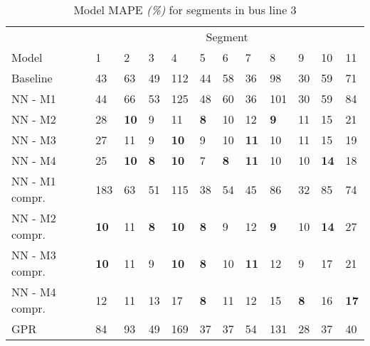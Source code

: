\begin{table}[H]
  \centering
  \caption{Model MAPE \textit{(\%)} for segments in bus line 3}
  \label{fig:model-mape-of-segs-203}
  \begin{adjustbox}{center}

    \begin{tabular}{l|l|l|l|l|l|l|l|l|l|l|l}
      & \multicolumn{11}{c}{Segment}                                                                                                                                                      \\
		Model          & 1             & 2             & 3             & 4             & 5             & 6            & 7              & 8             & 9             & 10             & 11               \\ 
		\hline
		Baseline       & 43          & 63          & 49          & 112         & 44          & 58         & 36           & 98          & 30          & 59           & 71             \\
		NN - M1        & 44         & 66         & 53         & 125        & 48         & 60        & 36          & 101        & 30         & 59          & 84            \\
		NN - M2        & 28         & \textbf{10}         & 9          & 11         & \textbf{8}          & 10        & 12          & \textbf{9} & 11          & 15          & 21            \\
		NN - M3        & 27         & 11         & 9         & \textbf{10}         & 9          & 10         & \textbf{11}          & 10          & 11         & 15          & 19            \\
		NN - M4        & 25         & \textbf{10} & \textbf{8} & \textbf{10}          & 7          & \textbf{8} & \textbf{11}          & 10          & 10         & \textbf{14}          & 18            \\
		NN - M1 compr. & 183        & 63         & 51         & 115        & 38         & 54        & 45          & 86         & 32         & 85           & 74            \\
		NN - M2 compr. & \textbf{10}          & 11         & \textbf{8}          & \textbf{10} & \textbf{8} & 9         & 12          & \textbf{9}          & 10          & \textbf{14} & 27            \\
		NN - M3 compr. & \textbf{10} & 11         & 9          & \textbf{10}          & \textbf{8}          & 10         & \textbf{11} & 12        & 9          & 17           & 21            \\
		NN - M4 compr. & 12         & 11         & 13         & 17         & \textbf{8}          & 11         & 12          & 15         & \textbf{8} & 16           & \textbf{17}  \\
	GPR         & 84 & 93 & 49 & 169 & 37 & 37 &  54 & 131 & 28 &37 & 40 \\
		\end{tabular}
\end{adjustbox}
\end{table}

